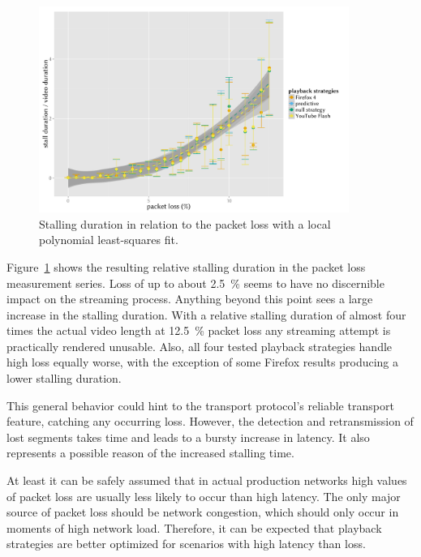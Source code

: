 \begin{figure}[htbp]
	\centering
	\includegraphics[width=0.9\textwidth]{images/R-playbackemulation-stallduration-loss.pdf}
	\caption{Stalling duration in relation to the packet loss with a local polynomial least-squares fit.}
\label{c3:fig:eval-loss-stallingtime}
\end{figure}

Figure~\ref{c3:fig:eval-loss-stallingtime} shows the resulting relative stalling duration in the packet loss measurement series. Loss of up to about \SI{2.5}{\percent} seems to have no discernible impact on the streaming process. Anything beyond this point sees a large increase in the stalling duration. With a relative stalling duration of almost four times the actual video length at \SI{12.5}{\percent} packet loss any streaming attempt is practically rendered unusable. Also, all four tested playback strategies handle high loss equally worse, with the exception of some Firefox results producing a lower stalling duration.

This general behavior could hint to the transport protocol's reliable transport feature, catching any occurring loss. However, the detection and retransmission of lost segments takes time and leads to a bursty increase in latency. It also represents a possible reason of the increased stalling time. 

At least it can be safely assumed that in actual production networks high values of packet loss are usually less likely to occur than high latency. The only major source of packet loss should be network congestion, which should only occur in moments of high network load. Therefore, it can be expected that playback strategies are better optimized for scenarios with high latency than loss.


